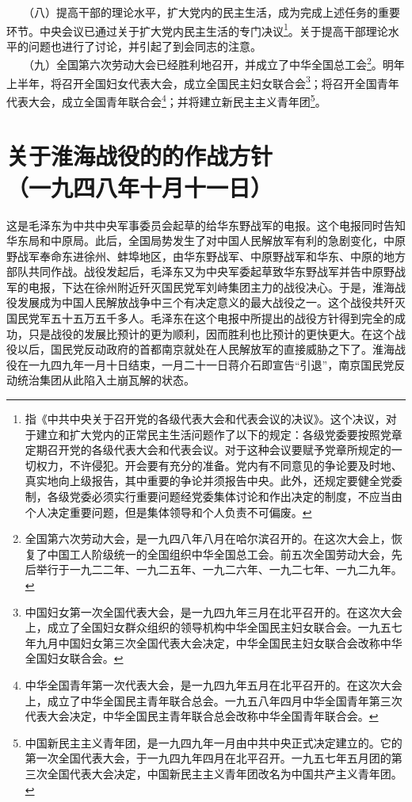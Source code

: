 \documentclass[cn,11pt,chinese]{elegantbook}
\def\myformat#1{\hfil\hfil #1}
\begin{document}
　　（八）提高干部的理论水平，扩大党内的民主生活，成为完成上述任务的重要环节。中央会议已通过关于扩大党内民主生活的专门决议\footnote[6]{ 指《中共中央关于召开党的各级代表大会和代表会议的决议》。这个决议，对于建立和扩大党内的正常民主生活问题作了以下的规定：各级党委要按照党章定期召开党的各级代表大会和代表会议。对于这种会议要赋予党章所规定的一切权力，不许侵犯。开会要有充分的准备。党内有不同意见的争论要及时地、真实地向上级报告，其中重要的争论并须报告中央。此外，还规定要健全党委制，各级党委必须实行重要问题经党委集体讨论和作出决定的制度，不应当由个人决定重要问题，但是集体领导和个人负责不可偏废。}。关于提高干部理论水平的问题也进行了讨论，并引起了到会同志的注意。\\
　　（九）全国第六次劳动大会已经胜利地召开，并成立了中华全国总工会\footnote[7]{ 全国第六次劳动大会，是一九四八年八月在哈尔滨召开的。在这次大会上，恢复了中国工人阶级统一的全国组织中华全国总工会。前五次全国劳动大会，先后举行于一九二二年、一九二五年、一九二六年、一九二七年、一九二九年。}。明年上半年，将召开全国妇女代表大会，成立全国民主妇女联合会\footnote[8]{ 中国妇女第一次全国代表大会，是一九四九年三月在北平召开的。在这次大会上，成立了全国妇女群众组织的领导机构中华全国民主妇女联合会。一九五七年九月中国妇女第三次全国代表大会决定，中华全国民主妇女联合会改称中华全国妇女联合会。}；将召开全国青年代表大会，成立全国青年联合会\footnote[9]{ 中华全国青年第一次代表大会，是一九四九年五月在北平召开的。在这次大会上，成立了中华全国民主青年联合总会。一九五八年四月中华全国青年第三次代表大会决定，中华全国民主青年联合总会改称中华全国青年联合会。}；并将建立新民主主义青年团\footnote[10]{ 中国新民主主义青年团，是一九四九年一月由中共中央正式决定建立的。它的第一次全国代表大会，于一九四九年四月在北平召开。一九五七年五月团的第三次全国代表大会决定，中国新民主主义青年团改名为中国共产主义青年团。}。
\newpage\section*{\myformat{关于淮海战役的的作战方针}\\\myformat{（一九四八年十月十一日）}}
\begin{introduction}\item  这是毛泽东为中共中央军事委员会起草的给华东野战军的电报。这个电报同时告知华东局和中原局。此后，全国局势发生了对中国人民解放军有利的急剧变化，中原野战军奉命东进徐州、蚌埠地区，由华东野战军、中原野战军和华东、中原的地方部队共同作战。战役发起后，毛泽东又为中央军委起草致华东野战军并告中原野战军的电报，下达在徐州附近歼灭国民党军刘峙集团主力的战役决心。于是，淮海战役发展成为中国人民解放战争中三个有决定意义的最大战役之一。这个战役共歼灭国民党军五十五万五千多人。毛泽东在这个电报中所提出的战役方针得到完全的成功，只是战役的发展比预计的更为顺利，因而胜利也比预计的更快更大。在这个战役以后，国民党反动政府的首都南京就处在人民解放军的直接威胁之下了。淮海战役在一九四九年一月十日结束，一月二十一日蒋介石即宣告“引退”，南京国民党反动统治集团从此陷入土崩瓦解的状态。\end{introduction}
\end{document}
